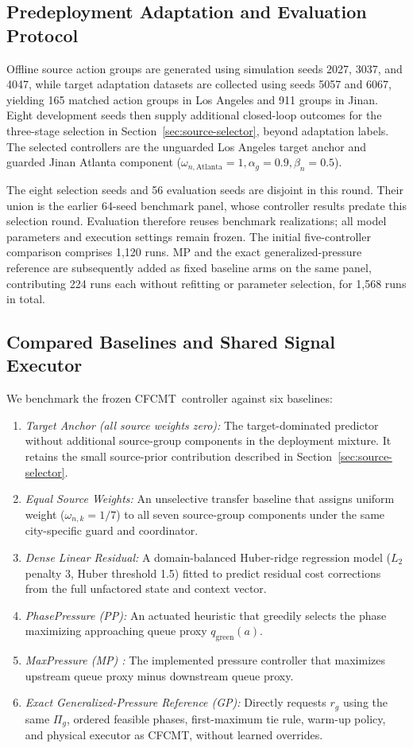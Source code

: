 \documentclass[letterpaper,journal]{IEEEtran}
\newcommand{\method}{CFCMT}
\begin{document}
\subsection{Predeployment Adaptation and Evaluation Protocol}
Offline source action groups are generated using simulation seeds 2027, 3037, and 4047, while target adaptation datasets are collected using seeds 5057 and 6067, yielding 165 matched action groups in Los Angeles and 911 groups in Jinan. Eight development seeds then supply additional closed-loop outcomes for the three-stage selection in Section~\ref{sec:source-selector}, beyond adaptation labels. The selected controllers are the unguarded Los Angeles target anchor and guarded Jinan Atlanta component ($\omega_{n,\mathrm{Atlanta}}=1, \alpha_g=0.9, \beta_n=0.5$).

The eight selection seeds and 56 evaluation seeds are disjoint in this round. Their union is the earlier 64-seed benchmark panel, whose controller results predate this selection round. Evaluation therefore reuses benchmark realizations; all model parameters and execution settings remain frozen. The initial five-controller comparison comprises 1,120 runs. MP and the exact generalized-pressure reference are subsequently added as fixed baseline arms on the same panel, contributing 224 runs each without refitting or parameter selection, for 1,568 runs in total.

\subsection{Compared Baselines and Shared Signal Executor}
We benchmark the frozen \method\ controller against six baselines:
\begin{enumerate}
    \item \textit{Target Anchor (all source weights zero):} The target-dominated predictor without additional source-group components in the deployment mixture. It retains the small source-prior contribution described in Section~\ref{sec:source-selector}.
    \item \textit{Equal Source Weights:} An unselective transfer baseline that assigns uniform weight ($\omega_{n,k}=1/7$) to all seven source-group components under the same city-specific guard and coordinator.
    \item \textit{Dense Linear Residual:} A domain-balanced Huber-ridge regression model ($L_2$ penalty 3, Huber threshold 1.5) fitted to predict residual cost corrections from the full unfactored state and context vector.
    \item \textit{PhasePressure (PP):} An actuated heuristic that greedily selects the phase maximizing approaching queue proxy $q_{\mathrm{green}}(a)$.
    \item \textit{MaxPressure (MP) \cite{varaiya2013maxpressure}:} The implemented pressure controller that maximizes upstream queue proxy minus downstream queue proxy.
    \item \textit{Exact Generalized-Pressure Reference (GP):} Directly requests $r_g$ using the same $\Pi_g$, ordered feasible phases, first-maximum tie rule, warm-up policy, and physical executor as \method, without learned overrides.
\end{enumerate}
\end{document}
